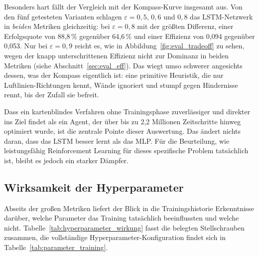\documentclass[
  a4paper,
  11pt,
  twoside,
  BCOR=8mm,           %
  headings=big,
  numbers=noenddot,
  listof=totoc,       %
  captions=tableheading,
]{scrreprt}
\begin{document}
Besonders hart fällt der Vergleich mit der Kompass-Kurve insgesamt aus. Von den fünf getesteten Varianten schlagen $\varepsilon=0{,}5$, $0{,}6$ und $0{,}8$ das LSTM-Netzwerk in \emph{beiden} Metriken gleichzeitig: bei $\varepsilon=0{,}8$ mit der größten Differenz, einer Erfolgsquote von 88,8\,\% gegenüber 64,6\,\% und einer Effizienz von 0,094 gegenüber 0,053. Nur bei $\varepsilon=0{,}9$ reicht es, wie in Abbildung~\ref{fig:eval_tradeoff} zu sehen, wegen der knapp unterschrittenen Effizienz nicht zur Dominanz in beiden Metriken (siehe Abschnitt~\ref{sec:eval_eff}). Das wiegt umso schwerer angesichts dessen, was der Kompass eigentlich ist: eine primitive Heuristik, die nur Luftlinien-Richtungen kennt, Wände ignoriert und stumpf gegen Hindernisse rennt, bis der Zufall sie befreit.

Dass ein kartenblindes Verfahren ohne Trainingsphase zuverlässiger und direkter ins Ziel findet als ein Agent, der über bis zu 2,2 Millionen Zeitschritte hinweg optimiert wurde, ist die zentrale Pointe dieser Auswertung. Das ändert nichts daran, dass das LSTM besser lernt als das MLP. Für die Beurteilung, wie leistungsfähig Reinforcement Learning für dieses spezifische Problem tatsächlich ist, bleibt es jedoch ein starker Dämpfer.

\subsection{Wirksamkeit der Hyperparameter}
\label{sec:eval_hyperparameter}
Abseits der großen Metriken liefert der Blick in die Trainingshistorie Erkenntnisse darüber, welche Parameter das Training tatsächlich beeinflussten und welche nicht. Tabelle~\ref{tab:hyperparameter_wirkung} fasst die belegten Stellschrauben zusammen, die vollständige Hyperparameter-Konfiguration findet sich in Tabelle~\ref{tab:parameter_training}.
\end{document}
